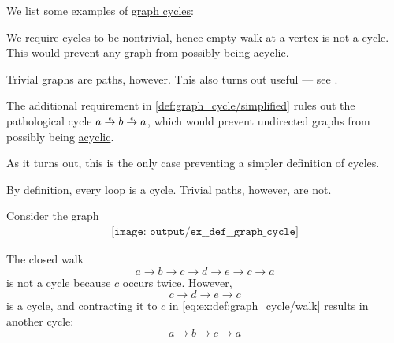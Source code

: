 \begin{example}\label{ex:def:graph_cycle}
  We list some examples of \hyperref[def:graph_cycle]{graph cycles}:
  \begin{thmenum}
     We require cycles to be nontrivial, hence \hyperref[def:graph_walk/empty]{empty walk} at a vertex is not a cycle. This would prevent any graph from possibly being \hyperref[def:acyclic_graph]{acyclic}.

    Trivial graphs are paths, however. This also turns out useful --- see .

     The additional requirement in \cref{def:graph_cycle/simplified} rules out the pathological cycle \( a \reloset e \to b \reloset e \to a \), which would prevent undirected graphs from possibly being \hyperref[def:acyclic_graph]{acyclic}.

    As it turns out, this is the only case preventing a simpler definition of cycles.

     By definition, every loop is a cycle. Trivial paths, however, are not.

     Consider the graph
    \begin{equation}\label{eq:ex:def:graph_cycle/eight}
      \begin{aligned}
        \texttt{[image: output/ex\_\_def\_\_graph\_cycle]}
      \end{aligned}
    \end{equation}

    The closed walk
    \begin{equation}\label{eq:ex:def:graph_cycle/walk}
      a \to b \to c \to d \to e \to c \to a
    \end{equation}
    is not a cycle because \( c \) occurs twice. However,
    \begin{equation*}
      c \to d \to e \to c
    \end{equation*}
    is a cycle, and contracting it to \( c \) in \eqref{eq:ex:def:graph_cycle/walk} results in another cycle:
    \begin{equation*}
      a \to b \to c \to a
    \end{equation*}
  \end{thmenum}
\end{example}

